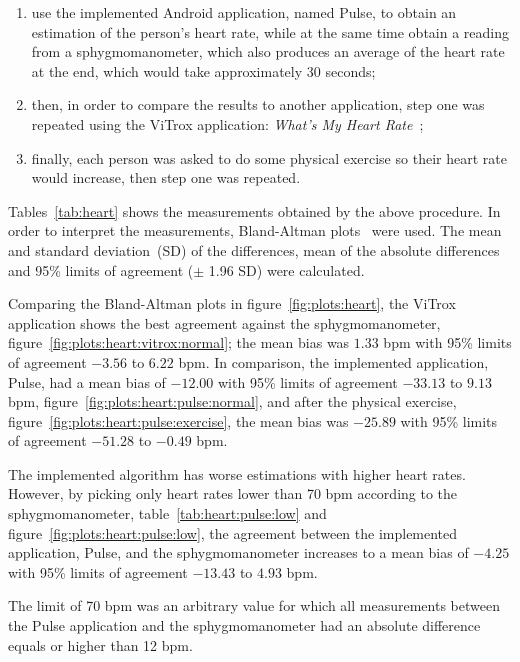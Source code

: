 \begin{enumerate}
  \item use the implemented Android application, named Pulse, to obtain an
        estimation of the person's heart rate, while at the same time
        obtain a reading from a sphygmomanometer, which also produces an
        average of the heart rate at the end, which would take
        approximately 30 seconds;
  \item then, in order to compare the results to another application,
        step one was repeated using the ViTrox application:
        \emph{What's My Heart Rate}~\cite{Vitrox2013};
  \item finally, each person was asked to do some physical exercise so
        their heart rate would increase, then step one was repeated.
\end{enumerate}

Tables~\ref{tab:heart} shows the measurements obtained by the above procedure.
In order to interpret the measurements, Bland-Altman
plots~\cite{Martin1986Statistical} were used.
The mean and standard deviation~(SD) of the differences, mean of the absolute
differences and 95\% limits of agreement ($\pm$ 1.96 SD) were calculated.

Comparing the Bland-Altman plots in figure~\ref{fig:plots:heart}, the ViTrox
application shows the best agreement against the sphygmomanometer,
figure~\ref{fig:plots:heart:vitrox:normal}; the mean bias was $1.33$ bpm
with 95\% limits of agreement $-3.56$ to $6.22$ bpm. In comparison,
the implemented application, Pulse, had a mean bias of $-12.00$ with
95\% limits of agreement $-33.13$ to $9.13$ bpm,
figure~\ref{fig:plots:heart:pulse:normal}, and after the physical exercise,
figure~\ref{fig:plots:heart:pulse:exercise}, the mean bias was $-25.89$
with 95\% limits of agreement $-51.28$ to $-0.49$ bpm.

The implemented algorithm has worse estimations with higher heart rates.
However, by picking only heart rates lower than 70 bpm according to the
sphygmomanometer, table~\ref{tab:heart:pulse:low} and
figure~\ref{fig:plots:heart:pulse:low}, the agreement between the
implemented application, Pulse, and the sphygmomanometer increases to
a mean bias of $-4.25$ with 95\% limits of agreement $-13.43$ to $4.93$ bpm.

The limit of 70 bpm was an arbitrary value for which all measurements
between the Pulse application and the sphygmomanometer had an absolute
difference equals or higher than 12 bpm.

